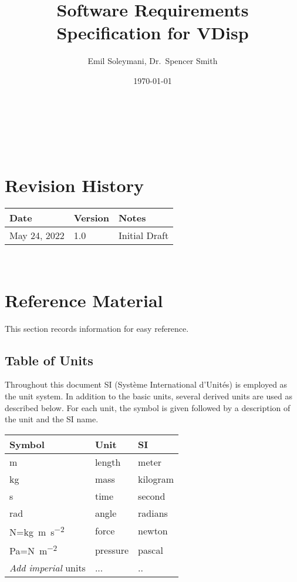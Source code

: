 \documentclass[12pt]{article}
\begin{document}
\title{Software Requirements Specification for VDisp} 
\author{Emil Soleymani, Dr.\ Spencer Smith}
\date{\today}
	
\maketitle

~\newpage


\tableofcontents

~\newpage

\section*{Revision History}

\begin{tabularx}{\textwidth}{p{3cm}p{2cm}X}
\toprule {\bf Date} & {\bf Version} & {\bf Notes}\\
\midrule
May 24, 2022 & 1.0 & Initial Draft\\
\bottomrule
\end{tabularx}

~\newpage

\section{Reference Material}

This section records information for easy reference.

\subsection{Table of Units}

Throughout this document SI (Syst\`{e}me International d'Unit\'{e}s) is employed
as the unit system.  In addition to the basic units, several derived units are
used as described below.  For each unit, the symbol is given followed by a
description of the unit and the SI name.

\renewcommand{\arraystretch}{1.2}
  \noindent \begin{tabular}{l l l} 
    \toprule		
    \textbf{Symbol} & \textbf{Unit} & \textbf{SI}\\
    \midrule 
    \si{\metre} & length & meter\\
    \si{\kilogram} & mass	& kilogram\\
    \si{\second} & time & second\\
    \si{\radian} & angle & radians\\
    \si{\newton}=\si{\kilogram\meter\per\square\second} & force & newton\\
    \si{\pascal}=\si{\newton\per\square\meter} & pressure & pascal\\
    \emph{Add imperial} units & ... & ..\\
    \bottomrule
  \end{tabular}
\end{document}
